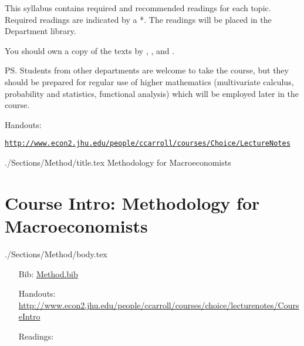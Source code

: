 \documentclass{\econtex}
\begin{document}
This syllabus contains required and recommended readings for each
topic.  Required readings are indicated by a *.  The readings will be
placed in the Department library.

You should own a copy of the texts by \cite{blanchard&fischer:text}, \cite{deatonUnderstandingC}, 
\cite{romer:text} and \cite{lsRecurse}.

PS.  Students from other departments are welcome to take the course, but 
they should be prepared for regular use of higher mathematics (multivariate
calculus, probability and statistics, functional analysis) which will be employed
later in the course.

\noindent Handouts: 

\texttt{\href{http://www.econ2.jhu.edu/people/ccarroll/courses/Choice/LectureNotes}{http://www.econ2.jhu.edu/people/ccarroll/courses/Choice/LectureNotes}}

\pagebreak


\begin{verbatimwrite}{./Sections/Method/title.tex}
Methodology for Macroeconomists
\end{verbatimwrite}
\section{Course Intro: Methodology for Macroeconomists}

\begin{verbatimwrite}{./Sections/Method/body.tex}

\begin{itemize}
\item[Bib:] \href{http://www.econ2.jhu.edu/people/ccarroll/courses/choice/Syllabus/Method.bib}{Method.bib}
\item[Handouts:]  \url{http://www.econ2.jhu.edu/people/ccarroll/courses/choice/lecturenotes/CourseIntro}
\item[Readings:]
\end{itemize}

\newcommand{\si}{\cite{summersIllusion}}
\newcommand{\ac}{\cite{acemogluCrisis}}
\newcommand{\gk}{\cite{grantKeynes}}
\newcommand{\kh}{\cite{krugmanHistory}}
\newcommand{\cp}{\cite{caballeroPretense}}

\begin{itemize} 
\reqd \si
\reqd \ac
\reqd \gk
\reqd \kh
\reqd \cp
\reqd \cite{barberaFight}
\end{itemize}

\end{verbatimwrite}
\end{document}
